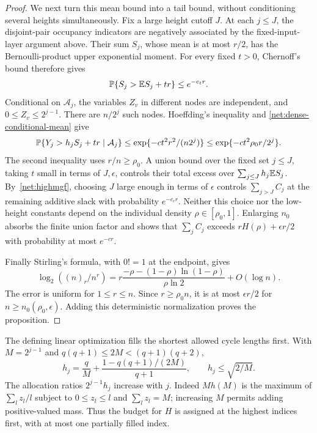 \begin{proof}
We next turn this mean bound into a tail bound, without conditioning
several heights simultaneously.  Fix a large height cutoff $J$.
At each $j\le J$, the disjoint-pair occupancy indicators are
negatively associated by the fixed-input-layer argument above.
Their sum $S_j$, whose mean is at most $r/2$, has the Bernoulli-product
upper exponential moment.  For every fixed $t>0$, Chernoff's bound
therefore gives
\[
 \mathbb P\{S_j>\mathbb E S_j+tr\}\le e^{-c_t r}.
\]
Conditional on $\mathcal A_j$, the variables $Z_v$ in different
nodes are independent, and $0\le Z_v\le2^{j-1}$.  There are
$n/2^j$ such nodes.  Hoeffding's inequality and
\eqref{net:dense-conditional-mean} give
\[
 \mathbb P\{Y_j>h_jS_j+tr\mid\mathcal A_j\}
 \le \exp\{-c t^2r^2/(n2^j)\}
 \le \exp\{-c t^2\rho_0 r/2^j\}.
\]
The second inequality uses $r/n\ge\rho_0$.  A union bound over
the fixed set $j\le J$, taking $t$ small in terms of $J,\epsilon$,
controls their total excess over $\sum_{j\le J}h_j\mathbb E S_j$.
By~\eqref{net:highmgf}, choosing $J$ large enough in terms of
$\epsilon$ controls $\sum_{j>J}C_j$ at the remaining additive
slack with probability $e^{-c_\epsilon r}$.  Neither this choice
nor the low-height constants depend on the individual density
$\rho\in[\rho_0,1]$.  Enlarging $n_0$ absorbs the finite union
factor and shows that $\sum_jC_j$ exceeds
$rH(\rho)+\epsilon r/2$ with probability at most $e^{-cr}$.

Finally Stirling's formula, with $0!=1$ at the endpoint, gives
\[
 \log_2((n)_r/n^r)
 =r\frac{-\rho-(1-\rho)\ln(1-\rho)}{\rho\ln2}+O(\log n).
\]
The error is uniform for $1\le r\le n$.  Since $r\ge\rho_0n$,
it is at most $\epsilon r/2$ for $n\ge n_0(\rho_0,\epsilon)$.
Adding this deterministic normalization proves the proposition.
\end{proof}

The defining linear optimization fills the shortest allowed cycle lengths first. With $M=2^{j-1}$ and $q(q+1)\le2M<(q+1)(q+2)$,
\begin{equation}\label{net:hj}
 h_j=\frac qM+\frac{1-q(q+1)/(2M)}{q+1},
 \qquad h_j\le\sqrt{2/M}.
\end{equation}
The allocation ratios $2^{j-1}h_j$ increase with $j$. Indeed $Mh(M)$ is the maximum of $\sum_lz_l/l$ subject to $0\le z_l\le l$ and $\sum_lz_l=M$; increasing $M$ permits adding positive-valued mass. Thus the budget for $H$ is assigned at the highest indices first, with at most one partially filled index.

